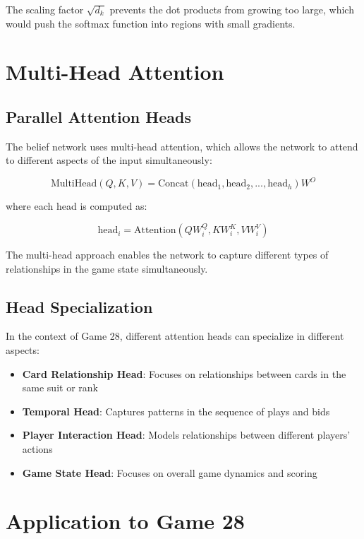 \documentclass[conference]{IEEEtran}
\begin{document}
The scaling factor $\sqrt{d_k}$ prevents the dot products from growing too large, which would push the softmax function into regions with small gradients.

\section{Multi-Head Attention}

\subsection{Parallel Attention Heads}

The belief network uses multi-head attention, which allows the network to attend to different aspects of the input simultaneously:

\begin{equation}
\text{MultiHead}(Q, K, V) = \text{Concat}(\text{head}_1, \text{head}_2, ..., \text{head}_h)W^O
\end{equation}

where each head is computed as:

\begin{equation}
\text{head}_i = \text{Attention}(QW_i^Q, KW_i^K, VW_i^V)
\end{equation}

The multi-head approach enables the network to capture different types of relationships in the game state simultaneously.

\subsection{Head Specialization}

In the context of Game 28, different attention heads can specialize in different aspects:

\begin{itemize}
    \item \textbf{Card Relationship Head}: Focuses on relationships between cards in the same suit or rank
    \item \textbf{Temporal Head}: Captures patterns in the sequence of plays and bids
    \item \textbf{Player Interaction Head}: Models relationships between different players' actions
    \item \textbf{Game State Head}: Focuses on overall game dynamics and scoring
\end{itemize}

\section{Application to Game 28}
\end{document}
